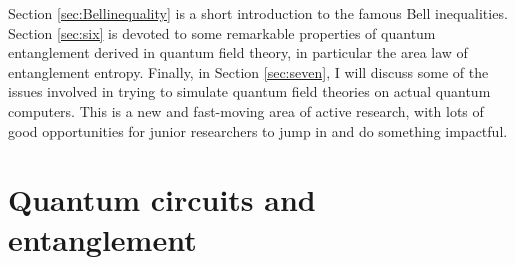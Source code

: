 \documentclass[a4paper,11pt]{article}
\begin{document}
Section \ref{sec:Bellinequality} is a short introduction to the famous Bell inequalities.
Section \ref{sec:six} is devoted to some remarkable properties of quantum entanglement derived in quantum field theory, in particular
the area law of entanglement entropy. Finally, in Section \ref{sec:seven},
I will discuss some of the issues involved in trying to simulate quantum field theories on actual quantum computers.
This is a new and fast-moving area of active research, with lots of good opportunities for junior researchers to jump in and do something
impactful. 



\section{Quantum circuits and entanglement}\label{sec:two}
\end{document}
